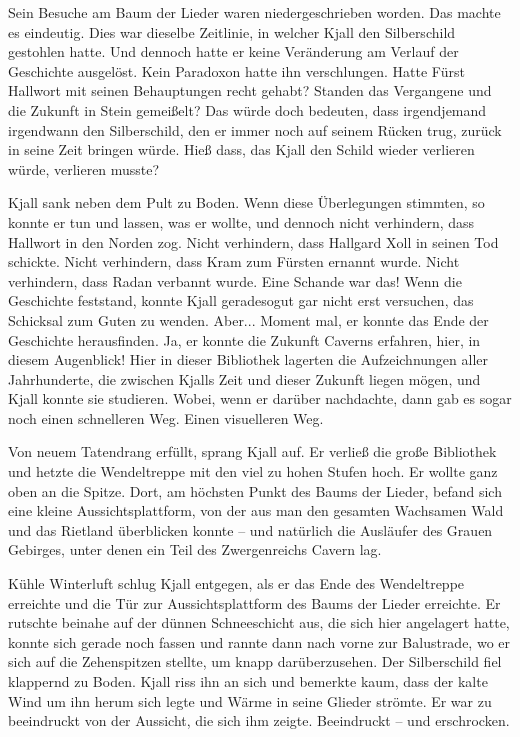 Sein Besuche am Baum der Lieder waren niedergeschrieben worden. Das machte es eindeutig. Dies war dieselbe Zeitlinie, in welcher Kjall den Silberschild gestohlen hatte. Und dennoch hatte er keine Veränderung am Verlauf der Geschichte ausgelöst. Kein Paradoxon hatte ihn verschlungen. Hatte Fürst Hallwort mit seinen Behauptungen recht gehabt? Standen das Vergangene und die Zukunft in Stein gemeißelt? Das würde doch bedeuten, dass irgendjemand irgendwann den Silberschild, den er immer noch auf seinem Rücken trug, zurück in seine Zeit bringen würde. Hieß dass, das Kjall den Schild wieder verlieren würde, verlieren musste?

Kjall sank neben dem Pult zu Boden. Wenn diese Überlegungen stimmten, so konnte er tun und lassen, was er wollte, und dennoch nicht verhindern, dass Hallwort in den Norden zog. Nicht verhindern, dass Hallgard Xoll in seinen Tod schickte. Nicht verhindern, dass Kram zum Fürsten ernannt wurde. Nicht verhindern, dass Radan verbannt wurde. Eine Schande war das! Wenn die Geschichte feststand, konnte Kjall geradesogut gar nicht erst versuchen, das Schicksal zum Guten zu wenden. Aber... Moment mal, er konnte das Ende der Geschichte herausfinden. Ja, er konnte die Zukunft Caverns erfahren, hier, in diesem Augenblick! Hier in dieser Bibliothek lagerten die Aufzeichnungen aller Jahrhunderte, die zwischen Kjalls Zeit und dieser Zukunft liegen mögen, und Kjall konnte sie studieren. Wobei, wenn er darüber nachdachte, dann gab es sogar noch einen schnelleren Weg. Einen visuelleren Weg.

Von neuem Tatendrang erfüllt, sprang Kjall auf. Er verließ die große Bibliothek und hetzte die Wendeltreppe mit den viel zu hohen Stufen hoch. Er wollte ganz oben an die Spitze. Dort, am höchsten Punkt des Baums der Lieder, befand sich eine kleine Aussichtsplattform, von der aus man den gesamten Wachsamen Wald und das Rietland überblicken konnte – und natürlich die Ausläufer des Grauen Gebirges, unter denen ein Teil des Zwergenreichs Cavern lag.

Kühle Winterluft schlug Kjall entgegen, als er das Ende des Wendeltreppe erreichte und die Tür zur Aussichtsplattform des Baums der Lieder erreichte. Er rutschte beinahe auf der dünnen Schneeschicht aus, die sich hier angelagert hatte, konnte sich gerade noch fassen und rannte dann nach vorne zur Balustrade, wo er sich auf die Zehenspitzen stellte, um knapp darüberzusehen. Der Silberschild fiel klappernd zu Boden. Kjall riss ihn an sich und bemerkte kaum, dass der kalte Wind um ihn herum sich legte und Wärme in seine Glieder strömte. Er war zu beeindruckt von der Aussicht, die sich ihm zeigte. Beeindruckt – und erschrocken.

